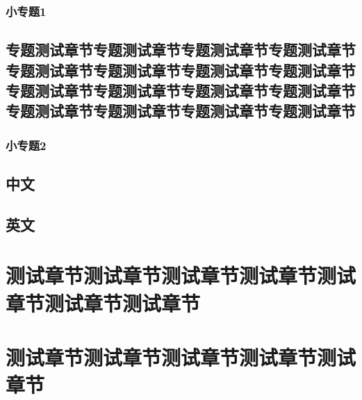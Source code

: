 \documentclass[color=green]{textbook-cn}%
\begin{document}
\begin{Topic}

\section{小专题1}
\chapter{专题测试章节专题测试章节专题测试章节专题测试章节专题测试章节专题测试章节专题测试章节专题测试章节专题测试章节专题测试章节专题测试章节专题测试章节专题测试章节专题测试章节专题测试章节专题测试章节}

\zhlipsum


\section{小专题2}
	
\end{Topic}


\begin{Appendix}


%
%
%

\end{Appendix}



\begin{Appendix}
\chapter[WWWW]{中文}
\zhlipsum
	
\chapter{英文}
\zhlipsum
\end{Appendix}


\part{测试章节测试章节测试章节测试章节测试章节测试章节测试章节}
\part[测试章节]{测试章节测试章节测试章节测试章节测试章节}

\lipsum\lipsum

\backmatter

\end{document}
